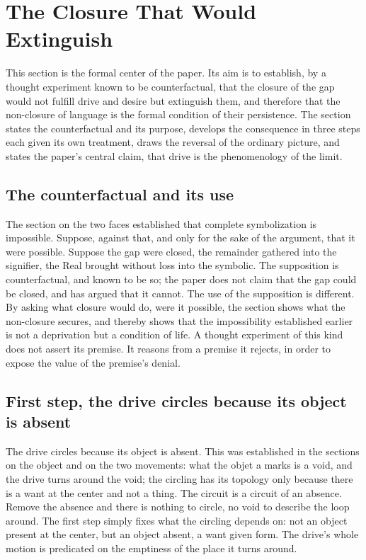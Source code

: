 \section{The Closure That Would Extinguish}
\label{p26:sec:deathtest}

\noindent
This section is the formal center of the paper. Its aim is to establish, by a thought experiment known to be counterfactual, that the closure of the gap would not fulfill drive and desire but extinguish them, and therefore that the non-closure of language is the formal condition of their persistence. The section states the counterfactual and its purpose, develops the consequence in three steps each given its own treatment, draws the reversal of the ordinary picture, and states the paper's central claim, that drive is the phenomenology of the limit.

\subsection*{The counterfactual and its use}

The section on the two faces established that complete symbolization is impossible. Suppose, against that, and only for the sake of the argument, that it were possible. Suppose the gap were closed, the remainder gathered into the signifier, the Real brought without loss into the symbolic. The supposition is counterfactual, and known to be so; the paper does not claim that the gap could be closed, and has argued that it cannot. The use of the supposition is different. By asking what closure would do, were it possible, the section shows what the non-closure secures, and thereby shows that the impossibility established earlier is not a deprivation but a condition of life. A thought experiment of this kind does not assert its premise. It reasons from a premise it rejects, in order to expose the value of the premise's denial.

\subsection*{First step, the drive circles because its object is absent}

The drive circles because its object is absent. This was established in the sections on the object and on the two movements: what the objet a marks is a void, and the drive turns around the void; the circling has its topology only because there is a want at the center and not a thing. The circuit is a circuit of an absence. Remove the absence and there is nothing to circle, no void to describe the loop around. The first step simply fixes what the circling depends on: not an object present at the center, but an object absent, a want given form. The drive's whole motion is predicated on the emptiness of the place it turns around.

